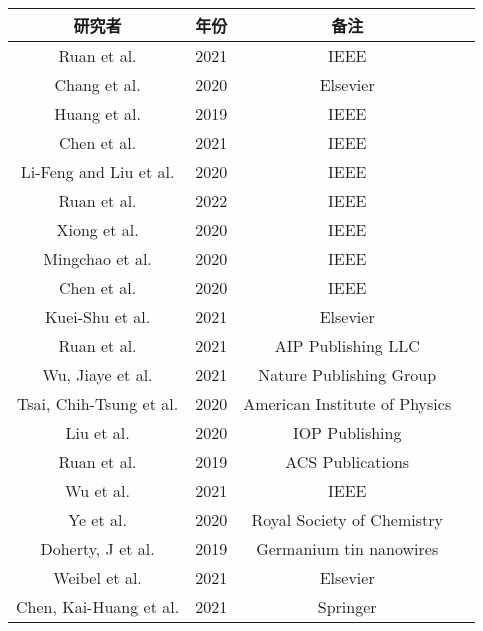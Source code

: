 \begin{center}
\begin{tabular}{cccc}
\hline
研究者 & 年份 & 备注 \\
\hline
Ruan et al. \cite{ruan2021enhanced} & 2021 & IEEE \\
Chang et al. \cite{chang2020low} & 2020 & Elsevier \\
Huang et al. \cite{huang2019high} & 2019 & IEEE \\
Chen et al. \cite{chen2017super} & 2021 & IEEE \\
Li-Feng and Liu et al. \cite{teng2013electrical} & 2020 & IEEE \\
Ruan et al. \cite{ruan2022performance} & 2022 & IEEE \\
Xiong et al. \cite{xiong2020investigation} & 2020 & IEEE \\
Mingchao et al. \cite{liu2020three} & 2020 & IEEE \\
Chen et al. \cite{chen2020advanced} & 2020 & IEEE \\
Kuei-Shu et al. \cite{ruan2021enhanced} & 2021 & Elsevier \\
Ruan et al. \cite{ruan2021improvement} & 2021 & AIP Publishing LLC \\
Wu, Jiaye et al. \cite{wu2021manipulation} & 2021 & Nature Publishing Group \\
Tsai, Chih-Tsung et al. \cite{tsai2007low} & 2020 & American Institute of Physics \\
Liu et al. \cite{liu2008improvement} & 2020 & IOP Publishing \\
Ruan et al. \cite{ruan2019performance} & 2019 & ACS Publications \\
Wu et al. \cite{wu2021improvement} & 2021 & IEEE \\
Ye et al. \cite{ye2017boosting} & 2020 & Royal Society of Chemistry \\
Doherty, J et al. \cite{doherty2018supercritical} & 2019 & Germanium tin nanowires\\
Weibel et al. \cite{weibel2003overview} & 2021 & Elsevier \\
Chen, Kai-Huang et al. \cite{chen2016improvement} & 2021 & Springer \\
\hline
\end{tabular}
\end{center}


